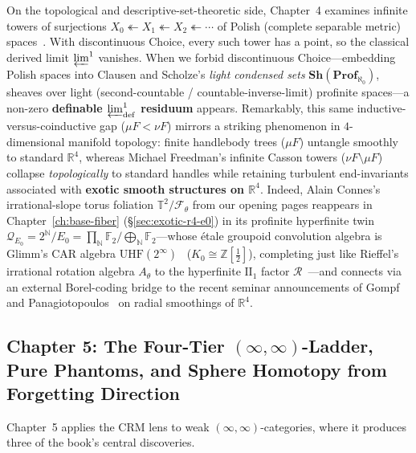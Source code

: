 \documentclass[10pt,twoside,openright]{book}
\theoremstyle{crmplain}
\theoremstyle{crmdef}
\theoremstyle{crmremark}
\begin{document}
On the topological and descriptive-set-theoretic side, Chapter~4 examines infinite towers of surjections $X_0 \twoheadleftarrow X_1 \twoheadleftarrow X_2 \twoheadleftarrow \cdots$ of Polish (complete separable metric) spaces~\cite[Ch.~I--II]{Kechris95}. With discontinuous Choice, every such tower has a point, so the classical derived limit $\varprojlim^1$ vanishes. When we forbid discontinuous Choice---embedding Polish spaces into Clausen and Scholze's \emph{light condensed sets} $\mathbf{Sh}(\mathbf{Prof}_{\aleph_0})$, sheaves over light (second-countable / countable-inverse-limit) profinite spaces---a non-zero \textbf{definable $\varprojlim^1_{\mathrm{def}}$ residuum} appears. Remarkably, this same inductive-versus-coinductive gap ($\mu F < \nu F$) mirrors a striking phenomenon in $4$-dimensional manifold topology: finite handlebody trees ($\mu F$) untangle smoothly to standard $\mathbb{R}^4$, whereas Michael Freedman's infinite Casson towers ($\nu F \setminus \mu F$) collapse \emph{topologically} to standard handles while retaining turbulent end-invariants associated with \textbf{exotic smooth structures on $\mathbb{R}^4$}. Indeed, Alain Connes's irrational-slope torus foliation $\mathbb{T}^2/\mathcal{F}_\theta$ from our opening pages reappears in Chapter~\ref{ch:base-fiber} (\S\ref{sec:exotic-r4-e0}) in its profinite hyperfinite twin $\mathcal{Q}_{E_0} = 2^{\mathbb{N}}/E_0 = \prod_{\mathbb{N}} \mathbb{F}_2 / \bigoplus_{\mathbb{N}} \mathbb{F}_2$---whose \'etale groupoid convolution algebra is Glimm's CAR algebra $\mathrm{UHF}(2^\infty)$~\cite{Glimm60} ($K_0 \cong \mathbb{Z}[\tfrac{1}{2}]$), completing just like Rieffel's irrational rotation algebra $A_\theta$ to the hyperfinite $\mathrm{II}_1$ factor $\mathcal{R}$~\cite[Ch.~V]{Connes94}---and connects via an external Borel-coding bridge to the recent seminar announcements of Gompf and Panagiotopoulos~\cite{GompfPanagiotopoulos26} on radial smoothings of $\mathbb{R}^4$.

\subsection*{Chapter 5: The Four-Tier $(\infty, \infty)$-Ladder, Pure Phantoms, and Sphere Homotopy from Forgetting Direction}

Chapter~5 applies the CRM lens to weak $(\infty, \infty)$-categories, where it produces three of the book's central discoveries.
\end{document}
